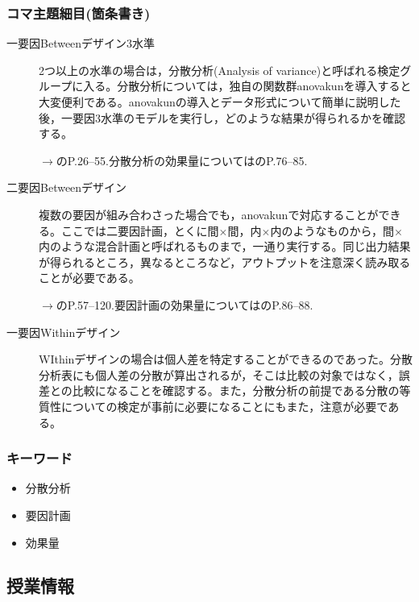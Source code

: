 \subsubsection{コマ主題細目(箇条書き)}
\begin{description}

	\item[一要因Betweenデザイン3水準]2つ以上の水準の場合は，分散分析(Analysis of variance)と呼ばれる検定グループに入る。分散分析については，独自の関数群anovakunを導入すると大変便利である。anovakunの導入とデータ形式について簡単に説明した後，一要因3水準のモデルを実行し，どのような結果が得られるかを確認する。

	      \begin{flushright}
		      $\to$\textcite{Hashimoto201607}のP.26--55.分散分析の効果量については\textcite{Matia201201}のP.76--85.
	      \end{flushright}

	\item[二要因Betweenデザイン]複数の要因が組み合わさった場合でも，anovakunで対応することができる。ここでは二要因計画，とくに間$\times$間，内$\times$内のようなものから，間$\times$内のような混合計画と呼ばれるものまで，一通り実行する。同じ出力結果が得られるところ，異なるところなど，アウトプットを注意深く読み取ることが必要である。

	      \begin{flushright}
		      $\to$\textcite{Hashimoto201607}のP.57--120.要因計画の効果量については\textcite{Matia201201}のP.86--88.
	      \end{flushright}

	\item[一要因Withinデザイン]WIthinデザインの場合は個人差を特定することができるのであった。分散分析表にも個人差の分散が算出されるが，そこは比較の対象ではなく，誤差との比較になることを確認する。また，分散分析の前提である分散の等質性についての検定が事前に必要になることにもまた，注意が必要である。

\end{description}
\subsubsection{キーワード}
\begin{itemize}
	\item 分散分析
	\item 要因計画
	\item 効果量
\end{itemize}
\subsection{授業情報}
